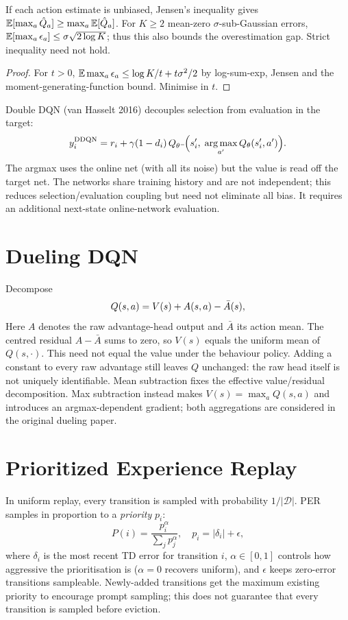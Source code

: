 \documentclass[11pt,oneside]{scrbook}
\begin{document}
\begin{proposition}
If each action estimate is unbiased, Jensen's inequality gives
$\mathbb{E}[\max_a\hat Q_a]\ge\max_a\mathbb{E}[\hat Q_a]$.
For $K\ge2$ mean-zero $\sigma$-sub-Gaussian errors,
$\mathbb{E}[\max_a\epsilon_a]\le\sigma\sqrt{2\log K}$; thus this also bounds
the overestimation gap. Strict inequality need not hold.
\end{proposition}
\begin{proof}
For $t>0$, $\mathbb{E}\max_a\epsilon_a\le\log K/t+t\sigma^2/2$ by
log-sum-exp, Jensen and the moment-generating-function bound. Minimise in $t$.
\end{proof}

Double DQN (van Hasselt 2016) decouples selection from evaluation in the target:
\begin{equation}
  y_i^{\text{DDQN}} = r_i + \gamma (1-d_i)\, Q_{\theta^-}\!\Bigl(s'_i,\;\operatorname*{arg\,max}_{a'} Q_\theta(s'_i, a')\Bigr).
  \label{eq:ddqn}
\end{equation}
The argmax uses the online net (with all its noise) but the value is read off the target
net. The networks share training history and are not independent; this
reduces selection/evaluation coupling but need not eliminate all bias. It
requires an additional next-state online-network evaluation.

\section{Dueling DQN}

Decompose
\[
  Q(s, a) = V(s) + A(s, a) - \bar A(s),
\]
Here $A$ denotes the raw advantage-head output and $\bar A$ its action mean.
The centred residual $A-\bar A$ sums to zero, so $V(s)$ equals the uniform
mean of $Q(s,\cdot)$. This need not equal the value under the behaviour
policy. Adding a constant to every raw advantage still leaves $Q$ unchanged:
the raw head itself is not uniquely identifiable. Mean subtraction fixes
the effective value/residual decomposition. Max subtraction instead makes
$V(s)=\max_aQ(s,a)$ and introduces an argmax-dependent gradient; both
aggregations are considered in the original dueling paper.

\section{Prioritized Experience Replay}

In uniform replay, every transition is sampled with probability $1/|\mathcal D|$. PER
samples in proportion to a \emph{priority} $p_i$:
\[
  P(i) = \frac{p_i^\alpha}{\sum_j p_j^\alpha}, \quad p_i = |\delta_i| + \epsilon,
\]
where $\delta_i$ is the most recent TD error for transition $i$, $\alpha \in [0,1]$
controls how aggressive the prioritisation is ($\alpha = 0$ recovers uniform), and
$\epsilon$ keeps zero-error transitions sampleable. Newly-added transitions get the
maximum existing priority to encourage prompt sampling; this does not
guarantee that every transition is sampled before eviction.
\end{document}
